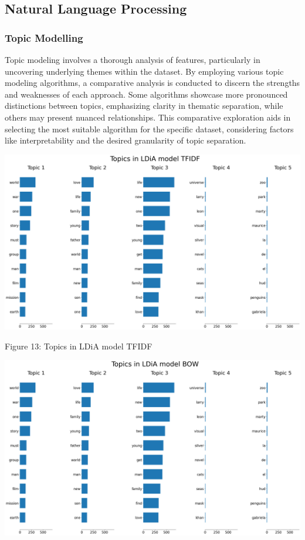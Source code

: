 \documentclass{article}
\begin{document}
\begin{multicols}{2}
\subsection{Natural Language Processing}

\subsubsection{Topic Modelling}

Topic modeling involves a thorough analysis of features, particularly in uncovering underlying themes within the dataset. By employing various topic modeling algorithms, a comparative analysis is conducted to discern the strengths and weaknesses of each approach. Some algorithms showcase more pronounced distinctions between topics, emphasizing clarity in thematic separation, while others may present nuanced relationships. This comparative exploration aids in selecting the most suitable algorithm for the specific dataset, considering factors like interpretability and the desired granularity of topic separation.

\includegraphics[scale=.1]{img/nlp1.png}

{\small
  Figure 13: Topics in LDiA model TFIDF
  \par
  \vspace{6pt}
}

\includegraphics[scale=.1]{img/nlp2.png}


\end{multicols}
\end{document}
